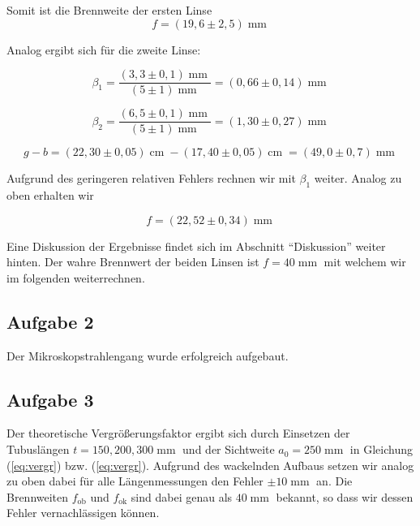 \documentclass[a4paper,german,12pt,smallheadings]{scrartcl}
\begin{document}
Somit ist die Brennweite der ersten Linse
\begin{equation}
  f = (19{,}6\pm2{,}5) \operatorname{mm}
\end{equation}

Analog ergibt sich für die zweite Linse:

\begin{equation}
  \beta_1 = \frac{(3{,}3 \pm 0{,}1) \operatorname{mm}}{(5\pm1) \operatorname{mm}} = (0{,}66\pm0{,}14) \operatorname{mm}
\end{equation}

\begin{equation}
  \beta_2 = \frac{(6{,}5 \pm 0{,}1) \operatorname{mm}}{(5\pm1) \operatorname{mm}} = (1{,}30\pm0{,}27) \operatorname{mm}
\end{equation}

\begin{equation}
  g -b = (22{,}30\pm0{,}05) \operatorname{cm} -
         (17{,}40 \pm 0{,}05) \operatorname{cm}
         = (49{,}0\pm0{,}7) \operatorname{mm}
\end{equation}

Aufgrund des geringeren relativen Fehlers rechnen wir mit $\beta_1$ weiter.
Analog zu oben erhalten wir

\begin{equation}
  f = (22{,}52 \pm 0{,}34) \operatorname{mm}
\end{equation}

Eine Diskussion der Ergebnisse findet sich im Abschnitt ``Diskussion'' weiter
hinten. Der wahre Brennwert der beiden Linsen ist $f = 40 \operatorname{mm}$
mit welchem wir im folgenden weiterrechnen.

\subsection{Aufgabe 2}

Der Mikroskopstrahlengang wurde erfolgreich aufgebaut.

\subsection{Aufgabe 3}
Der theoretische Vergrößerungsfaktor ergibt sich durch Einsetzen der
Tubuslängen $t = {150, 200, 300} \operatorname{mm}$ und der Sichtweite $a_0 =
250 \operatorname{mm}$ in Gleichung (\ref{eq:vergr}) bzw. (\ref{eq:vergr}).
Aufgrund des wackelnden Aufbaus setzen wir analog zu oben dabei für alle
Längenmessungen den Fehler $\pm 10 \operatorname{mm}$ an. Die Brennweiten
$f_\text{ob}$ und $f_\text{ok}$ sind dabei genau als $40 \operatorname{mm}$
bekannt, so dass wir dessen Fehler vernachlässigen können.
\end{document}
